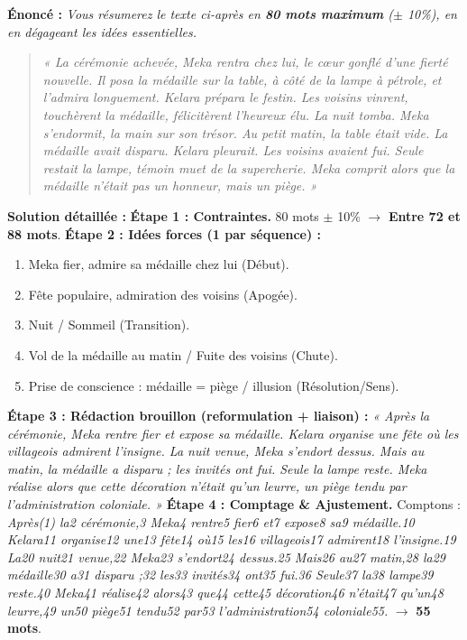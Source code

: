 \documentclass[11pt]{article}
\begin{document}
\begin{exoresolu}
\textbf{Énoncé :} \emph{Vous résumerez le texte ci-après en \textbf{80 mots maximum} ($\pm$ 10\%), en en dégageant les idées essentielles.}
\begin{quote}
\emph{« La cérémonie achevée, Meka rentra chez lui, le cœur gonflé d'une fierté nouvelle. Il posa la médaille sur la table, à côté de la lampe à pétrole, et l'admira longuement. Kelara prépara le festin. Les voisins vinrent, touchèrent la médaille, félicitèrent l'heureux élu. La nuit tomba. Meka s'endormit, la main sur son trésor. Au petit matin, la table était vide. La médaille avait disparu. Kelara pleurait. Les voisins avaient fui. Seule restait la lampe, témoin muet de la supercherie. Meka comprit alors que la médaille n'était pas un honneur, mais un piège. »}
\end{quote}
\tcblower
\textbf{Solution détaillée :}
\textbf{Étape 1 : Contraintes.} 80 mots $\pm$ 10\% $\rightarrow$ \textbf{Entre 72 et 88 mots}.
\textbf{Étape 2 : Idées forces (1 par séquence) :}
\begin{enumerate}
    \item Meka fier, admire sa médaille chez lui (Début).
    \item Fête populaire, admiration des voisins (Apogée).
    \item Nuit / Sommeil (Transition).
    \item Vol de la médaille au matin / Fuite des voisins (Chute).
    \item Prise de conscience : médaille = piège / illusion (Résolution/Sens).
\end{enumerate}
\textbf{Étape 3 : Rédaction brouillon (reformulation + liaison) :}
\emph{« Après la cérémonie, Meka rentre fier et expose sa médaille. Kelara organise une fête où les villageois admirent l'insigne. La nuit venue, Meka s'endort dessus. Mais au matin, la médaille a disparu ; les invités ont fui. Seule la lampe reste. Meka réalise alors que cette décoration n'était qu'un leurre, un piège tendu par l'administration coloniale. »}
\textbf{Étape 4 : Comptage \& Ajustement.}
Comptons : \emph{Après(1) la2 cérémonie,3 Meka4 rentre5 fier6 et7 expose8 sa9 médaille.10 Kelara11 organise12 une13 fête14 où15 les16 villageois17 admirent18 l'insigne.19 La20 nuit21 venue,22 Meka23 s'endort24 dessus.25 Mais26 au27 matin,28 la29 médaille30 a31 disparu ;32 les33 invités34 ont35 fui.36 Seule37 la38 lampe39 reste.40 Meka41 réalise42 alors43 que44 cette45 décoration46 n'était47 qu'un48 leurre,49 un50 piège51 tendu52 par53 l'administration54 coloniale55.} $\rightarrow$ \textbf{55 mots}.

\end{exoresolu}
\end{document}
